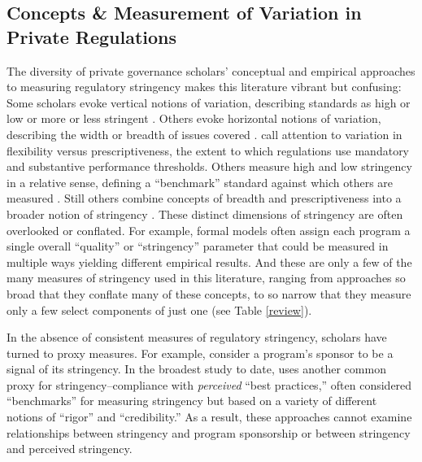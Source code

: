 \documentclass[
      12pt,
            Review ]{article}
\begin{document}
\hypertarget{concepts-measurement-of-variation-in-private-regulations}{%
\subsection{Concepts \& Measurement of Variation in Private Regulations}\label{concepts-measurement-of-variation-in-private-regulations}}

The diversity of private governance scholars' conceptual and empirical approaches to measuring regulatory stringency makes this literature vibrant but confusing: Some scholars evoke vertical notions of variation, describing standards as high or low or more or less stringent \citep{Fischer2014, Li2015}. Others evoke horizontal notions of variation, describing the width or breadth of issues covered \citep{Auld2014, Heyes2017}. \citet{Cashore2007} call attention to variation in flexibility versus prescriptiveness, the extent to which regulations use mandatory and substantive performance thresholds. Others measure high and low stringency in a relative sense, defining a ``benchmark'' standard against which others are measured \citep{Overdevest2005, Overdevest2010}. Still others combine concepts of breadth and prescriptiveness into a broader notion of stringency \citep{Fransen2011}. These distinct dimensions of stringency are often overlooked or conflated. For example, formal models often assign each program a single overall ``quality'' or ``stringency'' parameter that could be measured in multiple ways yielding different empirical results. And these are only a few of the many measures of stringency used in this literature, ranging from approaches so broad that they conflate many of these concepts, to so narrow that they measure only a few select components of just one (see Table \ref{review}).



In the absence of consistent measures of regulatory stringency, scholars have turned to proxy measures. For example, \citet{Darnall2010} consider a program's sponsor to be a signal of its stringency. In the broadest study to date, \citet{VanderVen2015} uses another common proxy for stringency--compliance with \emph{perceived} ``best practices,'' often considered ``benchmarks'' for measuring stringency but based on a variety of different notions of ``rigor'' and ``credibility.'' As a result, these approaches cannot examine relationships between stringency and program sponsorship or between stringency and perceived stringency.
\end{document}

